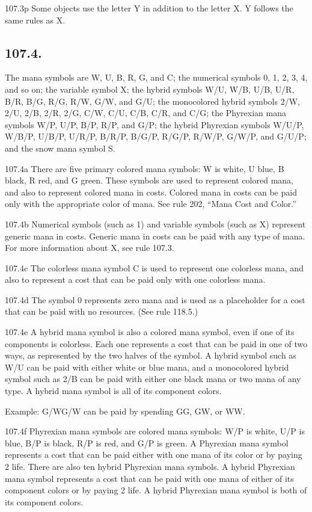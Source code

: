 107.3p Some objects use the letter Y in addition to the letter X. Y follows the same rules as X.

\subsection*{107.4.}
The mana symbols are {W}, {U}, {B}, {R}, {G}, and {C}; the numerical symbols {0}, {1}, {2}, {3}, {4}, and so on; the variable symbol {X}; the hybrid symbols {W/U}, {W/B}, {U/B}, {U/R}, {B/R}, {B/G}, {R/G}, {R/W}, {G/W}, and {G/U}; the monocolored hybrid symbols {2/W}, {2/U}, {2/B}, {2/R}, {2/G}, {C/W}, {C/U}, {C/B}, {C/R}, and {C/G}; the Phyrexian mana symbols {W/P}, {U/P}, {B/P}, {R/P}, and {G/P}; the hybrid Phyrexian symbols {W/U/P}, {W/B/P}, {U/B/P}, {U/R/P}, {B/R/P}, {B/G/P}, {R/G/P}, {R/W/P}, {G/W/P}, and {G/U/P}; and the snow mana symbol {S}.

107.4a There are five primary colored mana symbols: {W} is white, {U} blue, {B} black, {R} red, and {G} green. These symbols are used to represent colored mana, and also to represent colored mana in costs. Colored mana in costs can be paid only with the appropriate color of mana. See rule 202, “Mana Cost and Color.”

107.4b Numerical symbols (such as {1}) and variable symbols (such as {X}) represent generic mana in costs. Generic mana in costs can be paid with any type of mana. For more information about {X}, see rule 107.3.

107.4c The colorless mana symbol {C} is used to represent one colorless mana, and also to represent a cost that can be paid only with one colorless mana.

107.4d The symbol {0} represents zero mana and is used as a placeholder for a cost that can be paid with no resources. (See rule 118.5.)

107.4e A hybrid mana symbol is also a colored mana symbol, even if one of its components is colorless. Each one represents a cost that can be paid in one of two ways, as represented by the two halves of the symbol. A hybrid symbol such as {W/U} can be paid with either white or blue mana, and a monocolored hybrid symbol such as {2/B} can be paid with either one black mana or two mana of any type. A hybrid mana symbol is all of its component colors.

Example: {G/W}{G/W} can be paid by spending {G}{G}, {G}{W}, or {W}{W}.

107.4f Phyrexian mana symbols are colored mana symbols: {W/P} is white, {U/P} is blue, {B/P} is black, {R/P} is red, and {G/P} is green. A Phyrexian mana symbol represents a cost that can be paid either with one mana of its color or by paying 2 life. There are also ten hybrid Phyrexian mana symbols. A hybrid Phyrexian mana symbol represents a cost that can be paid with one mana of either of its component colors or by paying 2 life. A hybrid Phyrexian mana symbol is both of its component colors.

